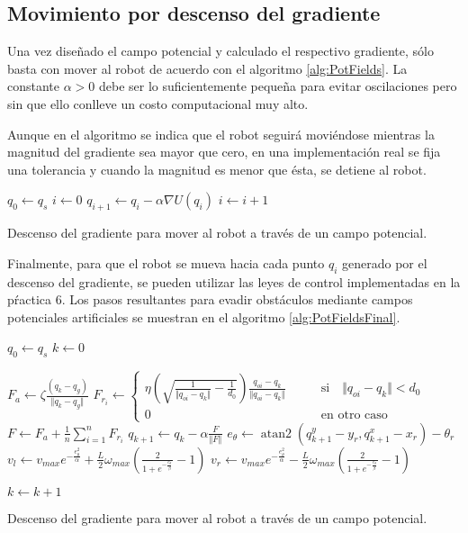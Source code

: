 \documentclass[letterpaper,12pt]{article}
\newcommand\ddfrac[2]{\frac{\displaystyle #1}{\displaystyle #2}}
\DeclareMathOperator{\atantwo}{atan2}
\begin{document}
\subsection{Movimiento por descenso del gradiente}
Una vez diseñado el campo potencial y calculado el respectivo gradiente, sólo basta con mover al robot de acuerdo con el algoritmo \ref{alg:PotFields}. La constante $\alpha > 0$ debe ser lo suficientemente pequeña para evitar oscilaciones pero sin que ello conlleve un costo computacional muy alto. 

Aunque en el algoritmo se indica que el robot seguirá moviéndose mientras la magnitud del gradiente sea mayor que cero, en una implementación real se fija una tolerancia y cuando la magnitud es menor que ésta, se detiene al robot. 
\begin{algorithm}
\DontPrintSemicolon
{}
$q_0 \leftarrow q_s$\;
$i \leftarrow 0$\;
{
  $q_{i+1} \leftarrow q_i - \alpha\nabla U(q_i)$\;
  $i \leftarrow i + 1$
}
  \caption{Descenso del gradiente para mover al robot a través de un campo potencial.}
  \label{alg:PotFields}
\end{algorithm}

Finalmente, para que el robot se mueva hacia cada punto $q_i$ generado por el descenso del gradiente, se pueden utilizar las leyes de control implementadas en la pŕactica 6. Los pasos resultantes para evadir obstáculos mediante campos potenciales artificiales se muestran en el algoritmo \ref{alg:PotFieldsFinal}.

\begin{algorithm}
\DontPrintSemicolon
{}
$q_0 \leftarrow q_s$\;
$k \leftarrow 0$\;
{
  $F_a \leftarrow \zeta \ddfrac{\left(q_k - q_g\right) }{\Vert q_k - q_g \Vert}$\;
  {
  $F_{r_i} \leftarrow \begin{cases}
    \eta\left(\sqrt{\frac{1}{\Vert q_{oi} - q_k\Vert} - \frac{1}{d_0}}\right)\ddfrac{q_{oi} - q_k}{\Vert q_{oi} - q_k\Vert}
    & \qquad\textrm{si}\quad \Vert q_{oi} - q_k\Vert < d_0\\
    0 & \qquad\textrm{en otro caso}
    \end{cases}$\;
  }
  $F \leftarrow F_a + \frac{1}{n}\sum_{i=1}^n F_{r_i}$\;
  $q_{k+1} \leftarrow q_k - \alpha \ddfrac{F}{\Vert F \Vert}$\;
  $e_{\theta} \leftarrow \atantwo\left(q_{k+1}^y - y_r, q_{k+1}^x - x_r\right) - \theta_r$\;
  $v_{l} \leftarrow v_{max}e^{-\frac{e_{\theta}^{2}}{\alpha}} + 
  \frac{L}{2}\omega_{max}\left(\frac{2}{1+e^{-\frac{e_{\theta}}{\beta}}}-1\right)$\;
  $v_{r} \leftarrow v_{max}e^{-\frac{e_{\theta}^{2}}{\alpha}} -
  \frac{L}{2}\omega_{max}\left(\frac{2}{1+e^{-\frac{e_{\theta}}{\beta}}}-1\right)$\;

  $k \leftarrow k + 1$
}
  \caption{Descenso del gradiente para mover al robot a través de un campo potencial.}
  \label{alg:PotFieldsFinal}
\end{algorithm}
\end{document}
